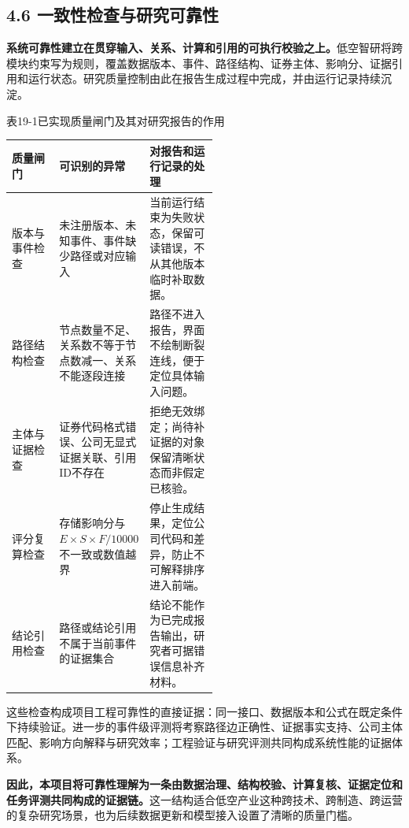 \subsection*{4.6 一致性检查与研究可靠性}\label{page:19}
\noindent\textbf{系统可靠性建立在贯穿输入、关系、计算和引用的可执行校验之上。}低空智研将跨模块约束写为规则，覆盖数据版本、事件、路径结构、证券主体、影响分、证据引用和运行状态。研究质量控制由此在报告生成过程中完成，并由运行记录持续沉淀\cite{lhy-contracts,lhy-orchestrator}。

\begin{center}\small 表19-1\quad 已实现质量闸门及其对研究报告的作用\par\vspace{1mm}
\begin{tabularx}{\linewidth}{p{0.23\linewidth}p{0.29\linewidth}X}
\toprule
质量闸门 & 可识别的异常 & 对报告和运行记录的处理\\
\midrule
版本与事件检查 & 未注册版本、未知事件、事件缺少路径或对应输入 & 当前运行结束为失败状态，保留可读错误，不从其他版本临时补取数据。\\
路径结构检查 & 节点数量不足、关系数不等于节点数减一、关系不能逐段连接 & 路径不进入报告，界面不绘制断裂连线，便于定位具体输入问题。\\
主体与证据检查 & 证券代码格式错误、公司无显式证据关联、引用ID不存在 & 拒绝无效绑定；尚待补证据的对象保留清晰状态而非假定已核验。\\
评分复算检查 & 存储影响分与$E\times S\times F/10000$不一致或数值越界 & 停止生成结果，定位公司代码和差异，防止不可解释排序进入前端。\\
结论引用检查 & 路径或结论引用不属于当前事件的证据集合 & 结论不能作为已完成报告输出，研究者可据错误信息补齐材料。\\
\bottomrule
\end{tabularx}\end{center}

这些检查构成项目工程可靠性的直接证据：同一接口、数据版本和公式在既定条件下持续验证。进一步的事件级评测将考察路径边正确性、证据事实支持、公司主体匹配、影响方向解释与研究效率；工程验证与研究评测共同构成系统性能的证据体系。

\noindent\textbf{因此，本项目将可靠性理解为一条由数据治理、结构校验、计算复核、证据定位和任务评测共同构成的证据链。}这一结构适合低空产业这种跨技术、跨制造、跨运营的复杂研究场景，也为后续数据更新和模型接入设置了清晰的质量门槛。
